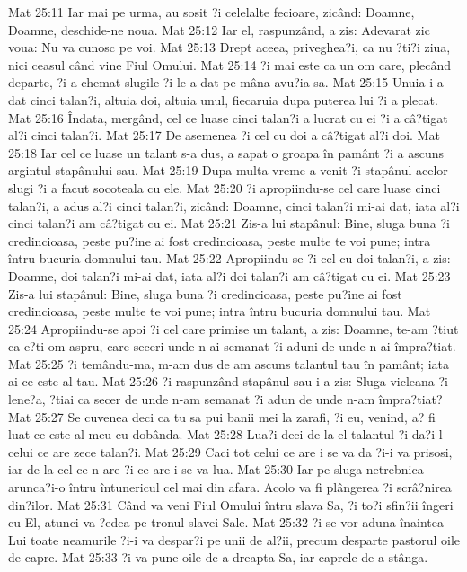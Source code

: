 Mat 25:11  Iar mai pe urma, au sosit ?i celelalte fecioare, zicând: Doamne, Doamne, deschide-ne noua.
Mat 25:12  Iar el, raspunzând, a zis: Adevarat zic voua: Nu va cunosc pe voi.
Mat 25:13  Drept aceea, priveghea?i, ca nu ?ti?i ziua, nici ceasul când vine Fiul Omului.
Mat 25:14  ?i mai este ca un om care, plecând departe, ?i-a chemat slugile ?i le-a dat pe mâna avu?ia sa.
Mat 25:15  Unuia i-a dat cinci talan?i, altuia doi, altuia unul, fiecaruia dupa puterea lui ?i a plecat.
Mat 25:16  Îndata, mergând, cel ce luase cinci talan?i a lucrat cu ei ?i a câ?tigat al?i cinci talan?i.
Mat 25:17  De asemenea ?i cel cu doi a câ?tigat al?i doi.
Mat 25:18  Iar cel ce luase un talant s-a dus, a sapat o groapa în pamânt ?i a ascuns argintul stapânului sau.
Mat 25:19  Dupa multa vreme a venit ?i stapânul acelor slugi ?i a facut socoteala cu ele.
Mat 25:20  ?i apropiindu-se cel care luase cinci talan?i, a adus al?i cinci talan?i, zicând: Doamne, cinci talan?i mi-ai dat, iata al?i cinci talan?i am câ?tigat cu ei.
Mat 25:21  Zis-a lui stapânul: Bine, sluga buna ?i credincioasa, peste pu?ine ai fost credincioasa, peste multe te voi pune; intra întru bucuria domnului tau.
Mat 25:22  Apropiindu-se ?i cel cu doi talan?i, a zis: Doamne, doi talan?i mi-ai dat, iata al?i doi talan?i am câ?tigat cu ei.
Mat 25:23  Zis-a lui stapânul: Bine, sluga buna ?i credincioasa, peste pu?ine ai fost credincioasa, peste multe te voi pune; intra întru bucuria domnului tau.
Mat 25:24  Apropiindu-se apoi ?i cel care primise un talant, a zis: Doamne, te-am ?tiut ca e?ti om aspru, care seceri unde n-ai semanat ?i aduni de unde n-ai împra?tiat.
Mat 25:25  ?i temându-ma, m-am dus de am ascuns talantul tau în pamânt; iata ai ce este al tau.
Mat 25:26  ?i raspunzând stapânul sau i-a zis: Sluga vicleana ?i lene?a, ?tiai ca secer de unde n-am semanat ?i adun de unde n-am împra?tiat?
Mat 25:27  Se cuvenea deci ca tu sa pui banii mei la zarafi, ?i eu, venind, a? fi luat ce este al meu cu dobânda.
Mat 25:28  Lua?i deci de la el talantul ?i da?i-l celui ce are zece talan?i.
Mat 25:29  Caci tot celui ce are i se va da ?i-i va prisosi, iar de la cel ce n-are ?i ce are i se va lua.
Mat 25:30  Iar pe sluga netrebnica arunca?i-o întru întunericul cel mai din afara. Acolo va fi plângerea ?i scrâ?nirea din?ilor.
Mat 25:31  Când va veni Fiul Omului întru slava Sa, ?i to?i sfin?ii îngeri cu El, atunci va ?edea pe tronul slavei Sale.
Mat 25:32  ?i se vor aduna înaintea Lui toate neamurile ?i-i va despar?i pe unii de al?ii, precum desparte pastorul oile de capre.
Mat 25:33  ?i va pune oile de-a dreapta Sa, iar caprele de-a stânga.
